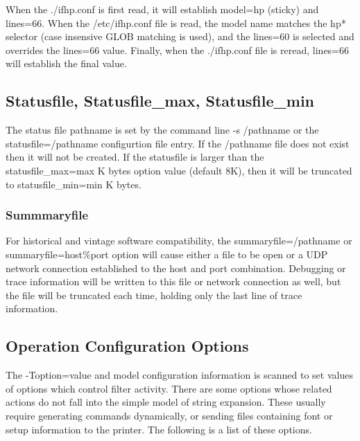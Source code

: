 \documentclass[a4paper]{article}
\begin{document}
When the
{\ttfamily ./ifhp.conf}
is first read,
it will establish
{\ttfamily model=hp}
(sticky) and 
{\ttfamily lines=66}.
When the
{\ttfamily /etc/ifhp.conf} file is read,
the model name matches the
{\ttfamily hp*} selector
(case insensive GLOB matching is used),
and the
{\ttfamily lines=60}
is selected and overrides the
{\ttfamily lines=66}
value.
Finally,
when the
{\ttfamily ./ifhp.conf}
file is reread,
{\ttfamily lines=66}
will establish the final value.


\subsection{Statusfile, Statusfile\_max, Statusfile\_min
\label{statusfile}
\label{statusfile_max}
\label{statusfile_min}}

The status file pathname is set by the command line
{\ttfamily -s /pathname}
or the
{\ttfamily statusfile=/pathname}
configurtion file entry.
If the
{\ttfamily /pathname}
file does not exist then it will not be created.
If the statusfile is larger than the
{\ttfamily statusfile\_max=max}
K bytes option value (default 8K),
then it will be truncated to
{\ttfamily statusfile\_min=min}
K bytes.


\subsubsection{Summmaryfile}

\label{summaryfile}
For historical and vintage software compatibility,
the
{\ttfamily summaryfile=/pathname}
or
{\ttfamily summaryfile=host\%port}
option will cause either a file to be open or a UDP network connection
established to the host  and port combination.
Debugging or trace information will be written to this file or network
connection as well, but the file will be truncated each time,
holding only the last line of trace information.




\subsection{Operation Configuration Options}

\label{optioninit}
\label{status}
\label{forcestatus}
\label{pjl}
\label{pcl}
\label{ps}
\label{text}
The
{\ttfamily -Toption=value}
and model configuration information is scanned
to set values of options which control filter activity.
There are some options whose related actions do not fall into
the simple model of string expansion.
These usually require generating commands dynamically,
or sending files containing font or setup information to the printer.
The following is a list of these options.
\end{document}
